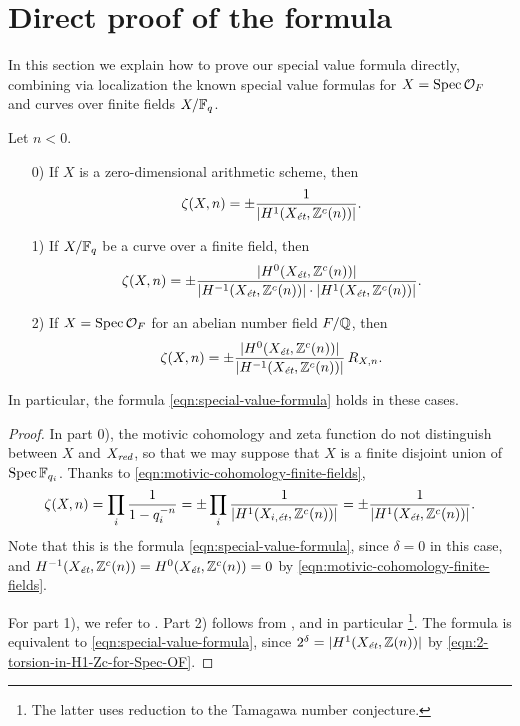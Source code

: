 \documentclass[draft]{article}
\numberwithin{equation}{section}
\begin{document}

\section{Direct proof of the formula}
\label{sec:demystification}

In this section we explain how to prove our special value formula directly,
combining via localization the known special value formulas for
$X = \Spec \mathcal{O}_F$ and curves over finite fields $X/\FF_q$.

\begin{lemma}
  \label{lemma:elementary-proof-1}
  Let $n < 0$.

  \begin{enumerate}
  \item[0)] If $X$ is a zero-dimensional arithmetic scheme, then
    $$\zeta (X,n) = \pm \frac{1}{|H^1 (X_\et, \ZZ^c (n))|}.$$

  \item[1)] If $X/\FF_q$ be a curve over a finite field, then
    \[ \zeta (X,n) =
      \pm\frac{|H^0 (X_\et, \ZZ^c(n))|}{|H^{-1} (X_\et, \ZZ^c(n))|\cdot |H^1 (X_\et, \ZZ^c(n))|}. \]

  \item[2)] If $X = \Spec \mathcal{O}_F$ for an abelian number field $F/\QQ$,
    then
    \[ \zeta (X,n) = \pm\frac{|H^0 (X_\et, \ZZ^c(n))|}{|H^{-1} (X_\et, \ZZ^c(n))|}\,R_{X,n}. \]
  \end{enumerate}

  In particular, the formula \eqref{eqn:special-value-formula} holds in these
  cases.

  \begin{proof}
    In part 0), the motivic cohomology and zeta function do not distinguish
    between $X$ and $X_\red$, so that we may suppose that $X$ is a finite
    disjoint union of $\Spec \FF_{q_i}$. Thanks to
    \eqref{eqn:motivic-cohomology-finite-fields},
    \[ \zeta (X,n) = \prod_i \frac{1}{1 - q_i^{-n}} =
      \pm \prod_i \frac{1}{|H^1 (X_{i,\et}, \ZZ^c (n))|} =
      \pm \frac{1}{|H^1 (X_\et, \ZZ^c (n))|}. \]
    Note that this is the formula \eqref{eqn:special-value-formula},
    since $\delta = 0$ in this case, and
    $H^{-1} (X_\et, \ZZ^c (n)) = H^0 (X_\et, \ZZ^c (n)) = 0$ by
    \eqref{eqn:motivic-cohomology-finite-fields}.

    \vspace{1em}

    For part 1), we refer to \cite[\S 5]{Beshenov-Weil-etale-2}.
    Part 2) follows from \cite[\S 5.8.3]{Flach-Morin-2018}, and in particular
    \cite[Proposition~5.35]{Flach-Morin-2018}\footnote{The latter uses reduction
      to the Tamagawa number conjecture.}.
    The formula is equivalent to \eqref{eqn:special-value-formula}, since
    $2^\delta = |H^1 (X_\et, \ZZ (n))|$ by
    \eqref{eqn:2-torsion-in-H1-Zc-for-Spec-OF}.
  \end{proof}
\end{lemma}
\end{document}
